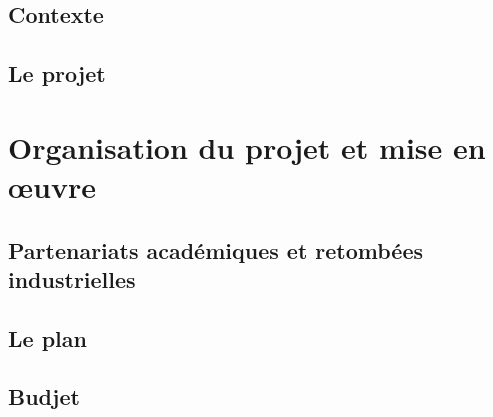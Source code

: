 \documentclass[french]{article}
\begin{document}
\subsection{Contexte}

\subsection{Le projet}

\section{Organisation du projet et mise en œuvre}

\subsection{Partenariats académiques et retombées industrielles}

\subsection{Le plan}

\subsection{Budjet}






\end{document}
